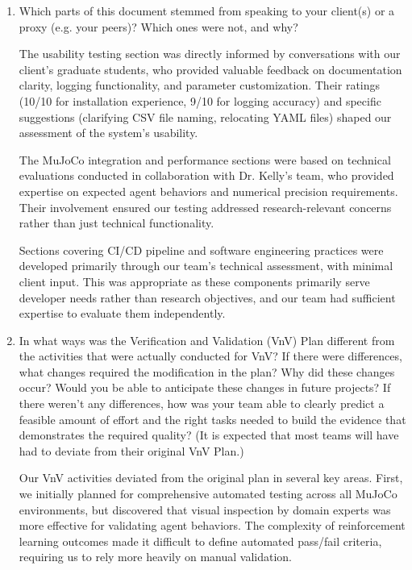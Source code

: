 \documentclass[12pt, titlepage]{article}
\begin{document}
\begin{enumerate}
  \item Which parts of this document stemmed from speaking to your client(s) or
  a proxy (e.g. your peers)? Which ones were not, and why?
  
  The usability testing section was directly informed by conversations with our client's graduate students, who provided valuable feedback on documentation clarity, logging functionality, and parameter customization. Their ratings (10/10 for installation experience, 9/10 for logging accuracy) and specific suggestions (clarifying CSV file naming, relocating YAML files) shaped our assessment of the system's usability.

  The MuJoCo integration and performance sections were based on technical evaluations conducted in collaboration with Dr. Kelly's team, who provided expertise on expected agent behaviors and numerical precision requirements. Their involvement ensured our testing addressed research-relevant concerns rather than just technical functionality.

  Sections covering CI/CD pipeline and software engineering practices were developed primarily through our team's technical assessment, with minimal client input. This was appropriate as these components primarily serve developer needs rather than research objectives, and our team had sufficient expertise to evaluate them independently.

  \item In what ways was the Verification and Validation (VnV) Plan different
  from the activities that were actually conducted for VnV?  If there were
  differences, what changes required the modification in the plan?  Why did
  these changes occur?  Would you be able to anticipate these changes in future
  projects?  If there weren't any differences, how was your team able to clearly
  predict a feasible amount of effort and the right tasks needed to build the
  evidence that demonstrates the required quality?  (It is expected that most
  teams will have had to deviate from their original VnV Plan.)
  
  Our VnV activities deviated from the original plan in several key areas. First, we initially planned for comprehensive automated testing across all MuJoCo environments, but discovered that visual inspection by domain experts was more effective for validating agent behaviors. The complexity of reinforcement learning outcomes made it difficult to define automated pass/fail criteria, requiring us to rely more heavily on manual validation.


\end{enumerate}
\end{document}
